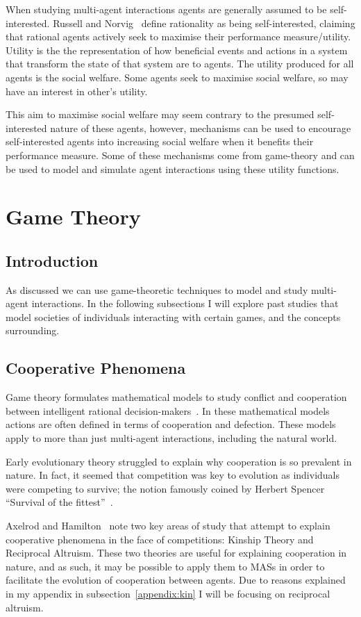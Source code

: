 \documentclass[]{final_report}
\begin{document}
When studying multi-agent interactions agents are generally assumed to be self-interested. Russell and Norvig~\cite{russell2016artificial} define rationality as being self-interested, claiming that rational agents actively seek to maximise their performance measure/utility. Utility is the the representation of how beneficial events and actions in a system that transform the state of that system are to agents. The utility produced for all agents is the social welfare. Some agents seek to maximise social welfare, so may have an interest in other's utility.\par
This aim to maximise social welfare may seem contrary to the presumed self-interested nature of these agents, however, mechanisms can be used to encourage self-interested agents into increasing social welfare when it benefits their performance measure. Some of these mechanisms come from game-theory and can be used to model and simulate agent interactions using these utility functions. 

\section{Game Theory}
\label{sec:backgroundgametheory}

\subsection{Introduction}
As discussed we can use game-theoretic techniques to model and study multi-agent interactions. In the following subsections I will explore past studies that model societies of individuals interacting with certain games, and the concepts surrounding.

\subsection{Cooperative Phenomena}
Game theory formulates mathematical models to study conflict and cooperation between intelligent rational decision-makers~\cite{myerson2013game}. In these mathematical models actions are often defined in terms of cooperation and defection. These models apply to more than just multi-agent interactions, including the natural world.\par 
Early evolutionary theory struggled to explain why cooperation is so prevalent in nature. In fact, it seemed that competition was key to evolution as individuals were competing to survive; the notion famously coined by Herbert Spencer ``Survival of the fittest''~\cite{spencer1864principles}.\par
Axelrod and Hamilton~\cite{evolution_of_cooperation} note two key areas of study that attempt to explain cooperative phenomena in the face of competitions: Kinship Theory and Reciprocal Altruism. These two theories are useful for explaining cooperation in nature, and as such, it may be possible to apply them to MASs in order to facilitate the evolution of cooperation between agents. Due to reasons explained in my appendix in subsection~\ref{appendix:kin} I will be focusing on reciprocal altruism.
\end{document}

